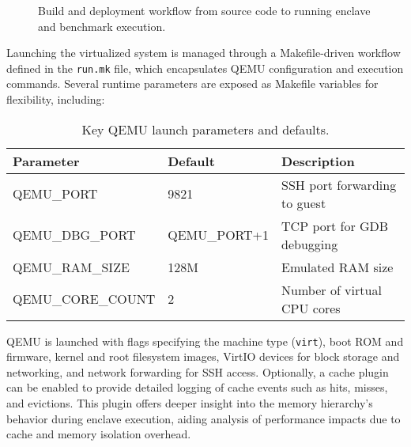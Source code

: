 \begin{figure}[htbp]
\centering
{}
\caption{Build and deployment workflow from source code to running enclave and benchmark execution.}
\label{fig:build_deployment_workflow}
\end{figure}


Launching the virtualized system is managed through a Makefile-driven workflow defined in the \texttt{run.mk} file, which encapsulates QEMU configuration and execution commands. Several runtime parameters are exposed as Makefile variables for flexibility, including:

\begin{table}[h]
\centering
\begin{tabular}{l l p{6cm}}
\toprule
\textbf{Parameter} & \textbf{Default} & \textbf{Description} \\
\midrule
QEMU\_PORT & 9821 & SSH port forwarding to guest \\
QEMU\_DBG\_PORT & QEMU\_PORT+1 & TCP port for GDB debugging \\
QEMU\_RAM\_SIZE & 128M & Emulated RAM size \\
QEMU\_CORE\_COUNT & 2 & Number of virtual CPU cores \\
\bottomrule
\end{tabular}
\caption{Key QEMU launch parameters and defaults.}
\end{table}


QEMU is launched with flags specifying the machine type (\texttt{virt}), boot ROM and firmware, kernel and root filesystem images, VirtIO devices for block storage and networking, and network forwarding for SSH access. Optionally, a cache plugin \cite{mandour2021cache} can be enabled to provide detailed logging of cache events such as hits, misses, and evictions. This plugin offers deeper insight into the memory hierarchy’s behavior during enclave execution, aiding analysis of performance impacts due to cache and memory isolation overhead.

